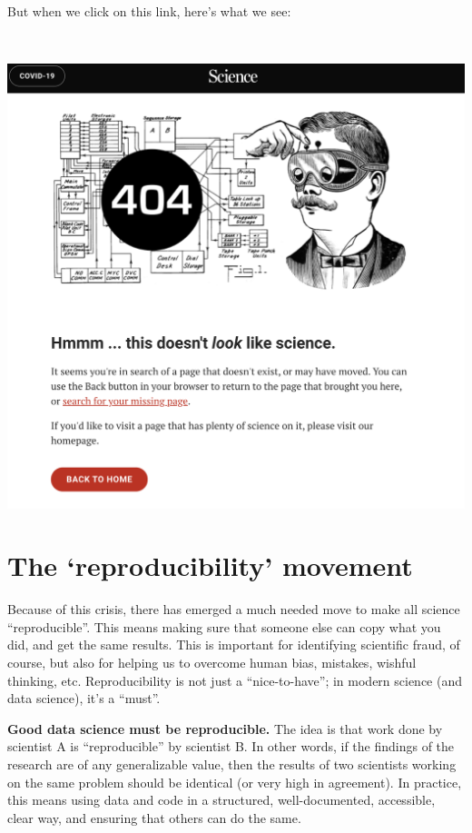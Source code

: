 \documentclass[
]{book}
\begin{document}
~

But when we click on this link, here's what we see:

~

\includegraphics{img/reproducibility-2.png}

\hypertarget{the-reproducibility-movement}{%
\section*{The `reproducibility' movement}\label{the-reproducibility-movement}}

Because of this crisis, there has emerged a much needed move to make all science ``reproducible''. This means making sure that someone else can copy what you did, and get the same results. This is important for identifying scientific fraud, of course, but also for helping us to overcome human bias, mistakes, wishful thinking, etc. Reproducibility is not just a ``nice-to-have''; in modern science (and data science), it's a ``must''.

\textbf{Good data science must be reproducible.} The idea is that work done by scientist A is ``reproducible'' by scientist B. In other words, if the findings of the research are of any generalizable value, then the results of two scientists working on the same problem should be identical (or very high in agreement). In practice, this means using data and code in a structured, well-documented, accessible, clear way, and ensuring that others can do the same.
\end{document}
